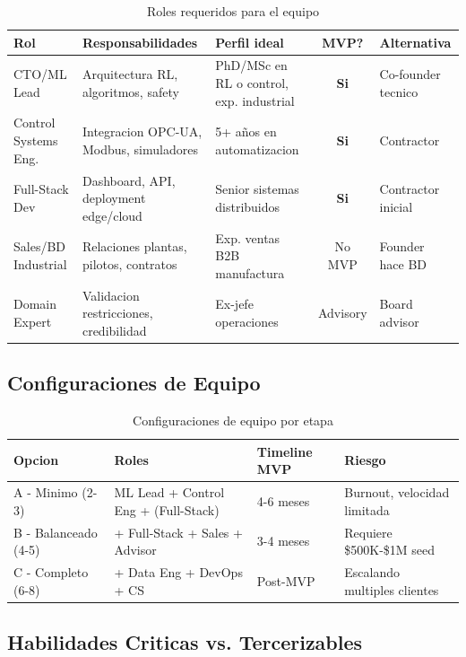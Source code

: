 \documentclass[11pt,a4paper]{article}
\begin{document}
\begin{table}[h]
\centering
\small
\begin{tabular}{p{2.5cm} p{3.5cm} p{3cm} c p{2.5cm}}
\toprule
\textbf{Rol} & \textbf{Responsabilidades} & \textbf{Perfil ideal} & \textbf{MVP?} & \textbf{Alternativa} \\
\midrule
CTO/ML Lead & Arquitectura RL, algoritmos, safety & PhD/MSc en RL o control, exp. industrial & \textbf{Si} & Co-founder tecnico \\
\addlinespace
Control Systems Eng. & Integracion OPC-UA, Modbus, simuladores & 5+ años en automatizacion & \textbf{Si} & Contractor \\
\addlinespace
Full-Stack Dev & Dashboard, API, deployment edge/cloud & Senior sistemas distribuidos & \textbf{Si} & Contractor inicial \\
\addlinespace
Sales/BD Industrial & Relaciones plantas, pilotos, contratos & Exp. ventas B2B manufactura & No MVP & Founder hace BD \\
\addlinespace
Domain Expert & Validacion restricciones, credibilidad & Ex-jefe operaciones & Advisory & Board advisor \\
\bottomrule
\end{tabular}
\caption{Roles requeridos para el equipo}
\end{table}

\subsection{Configuraciones de Equipo}

\begin{table}[h]
\centering
\begin{tabular}{p{3cm} p{4cm} p{3cm} p{3cm}}
\toprule
\textbf{Opcion} & \textbf{Roles} & \textbf{Timeline MVP} & \textbf{Riesgo} \\
\midrule
A - Minimo (2-3) & ML Lead + Control Eng + (Full-Stack) & 4-6 meses & Burnout, velocidad limitada \\
\addlinespace
B - Balanceado (4-5) & + Full-Stack + Sales + Advisor & 3-4 meses & Requiere \$500K-\$1M seed \\
\addlinespace
C - Completo (6-8) & + Data Eng + DevOps + CS & Post-MVP & Escalando multiples clientes \\
\bottomrule
\end{tabular}
\caption{Configuraciones de equipo por etapa}
\end{table}

\subsection{Habilidades Criticas vs. Tercerizables}
\end{document}
